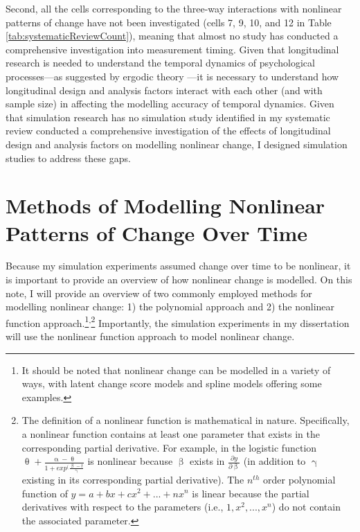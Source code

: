 \documentclass[
12pt, %
twoside,
english]{guelphthesis}
\begin{document}
Second, all the cells corresponding to the three-way interactions with nonlinear patterns of change have not been investigated (cells 7, 9, 10, and
12 in Table \ref{tab:systematicReviewCount}), meaning that almost no study has conducted a comprehensive investigation into measurement timing. Given that longitudinal research is needed to understand the temporal dynamics of psychological processes---as suggested by ergodic theory \autocite{molenaar2004}---it is necessary to understand how longitudinal design and analysis factors interact with each other (and with sample size) in affecting the modelling accuracy of temporal dynamics. Given that simulation research has no simulation study identified in my systematic review conducted a comprehensive investigation of the effects of longitudinal design and analysis factors on modelling nonlinear change, I designed simulation studies to address these gaps.

\hypertarget{modelling-change}{%
\section{Methods of Modelling Nonlinear Patterns of Change Over Time}\label{modelling-change}}

Because my simulation experiments assumed change over time to be nonlinear, it is important to provide an overview of how nonlinear change is modelled. On this note, I will provide an overview of two commonly employed methods for modelling nonlinear change: 1) the polynomial approach and 2) the nonlinear function approach.\footnote{It should be noted that nonlinear change can be modelled in a variety of ways, with latent change score models \parencite[e.g., ][]{orourke2021} and spline models \parencite[e.g., ][]{fine2020} offering some examples.}\textsuperscript{,}\footnote{The definition of a nonlinear function is mathematical in nature. Specifically, a nonlinear function contains at least one parameter that exists in the corresponding partial derivative. For example, in the logistic function $\uptheta + \frac{\upalpha - \uptheta}{1 + exp^(\frac{\upbeta - t}{\upgamma}}$ is nonlinear because $\upbeta$ exists in $\frac{\partial y}{\partial \upbeta}$ (in addition to $\upgamma$ existing in its corresponding partial derivative). The $n^{th}$ order polynomial function of $y = a + bx + cx^2 + ... + nx^n$ is linear because  the partial derivatives with respect to the parameters (i.e., $1, x^2, ..., x^n$) do not contain the associated parameter.} Importantly, the simulation experiments in my dissertation will use the nonlinear function approach to model nonlinear change.
\end{document}
